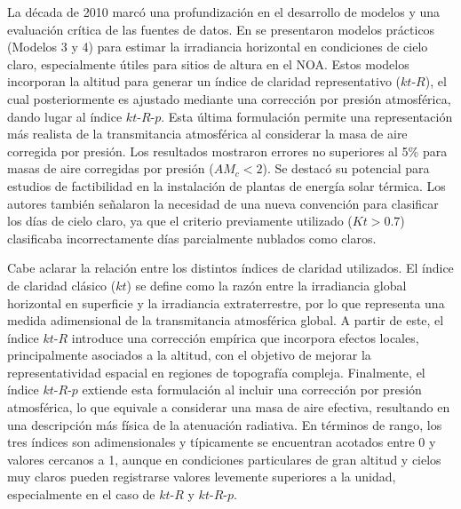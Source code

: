 \documentclass[letterpaper,12pt, twoside]{report}
\providecommand{\DIFdeltex}[1]{{\protect\color{red} \scriptsize #1}} %
\providecommand{\DIFdel}[1]{\texorpdfstring{\DIFdeltex{#1}}{}} %
\begin{document}
\DIFdel{La década de 2010 marcó una profundización en el desarrollo de modelos y una evaluación crítica de las fuentes de datos. En \cite{Salazar2010a} se presentaron modelos prácticos (Modelos 3 y 4) para estimar la irradiancia horizontal en condiciones de cielo claro, especialmente útiles para sitios de altura en el NOA. Estos modelos incorporan la altitud para generar un índice de claridad representativo ($kt\text{-}R$), el cual posteriormente es ajustado mediante una corrección por presión atmosférica, dando lugar al índice $kt\text{-}R\text{-}p$. Esta última formulación permite una representación más realista de la transmitancia atmosférica al considerar la masa de aire corregida por presión. Los resultados mostraron errores no superiores al 5\% para masas de aire corregidas por presión ($AM_c < 2$). Se destacó su potencial para estudios de factibilidad en la instalación de plantas de energía solar térmica. Los autores también señalaron la necesidad de una nueva convención para clasificar los días de cielo claro, ya que el criterio previamente utilizado ($Kt > 0.7$) clasificaba incorrectamente días parcialmente nublados como claros.}%

\DIFdel{Cabe aclarar la relación entre los distintos índices de claridad utilizados. El índice de claridad clásico ($kt$) se define como la razón entre la irradiancia global horizontal en superficie y la irradiancia extraterrestre, por lo que representa una medida adimensional de la transmitancia atmosférica global. A partir de este, el índice $kt\text{-}R$ introduce una corrección empírica que incorpora efectos locales, principalmente asociados a la altitud, con el objetivo de mejorar la representatividad espacial en regiones de topografía compleja. Finalmente, el índice $kt\text{-}R\text{-}p$ extiende esta formulación al incluir una corrección por presión atmosférica, lo que equivale a considerar una masa de aire efectiva, resultando en una descripción más física de la atenuación radiativa. En términos de rango, los tres índices son adimensionales y típicamente se encuentran acotados entre 0 y valores cercanos a 1, aunque en condiciones particulares de gran altitud y cielos muy claros pueden registrarse valores levemente superiores a la unidad, especialmente en el caso de $kt\text{-}R$ y $kt\text{-}R\text{-}p$.}%
\end{document}
